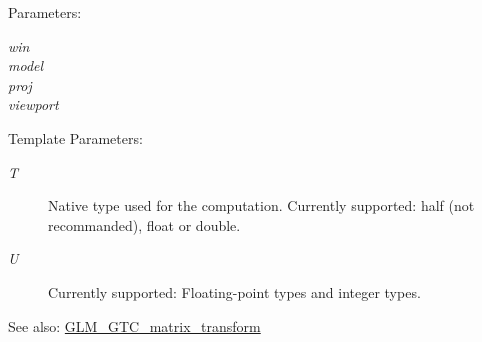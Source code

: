 \begin{Desc}
\item[Parameters:]
\begin{description}
\item[{\em win}]\item[{\em model}]\item[{\em proj}]\item[{\em viewport}]\end{description}
\end{Desc}
\begin{Desc}
\item[Template Parameters:]
\begin{description}
\item[{\em T}]Native type used for the computation. Currently supported: half (not recommanded), float or double. \item[{\em U}]Currently supported: Floating-point types and integer types. \end{description}
\end{Desc}
\begin{Desc}
\item[See also:]\hyperlink{group__gtc__matrix__transform}{GLM\_\-GTC\_\-matrix\_\-transform} \end{Desc}
